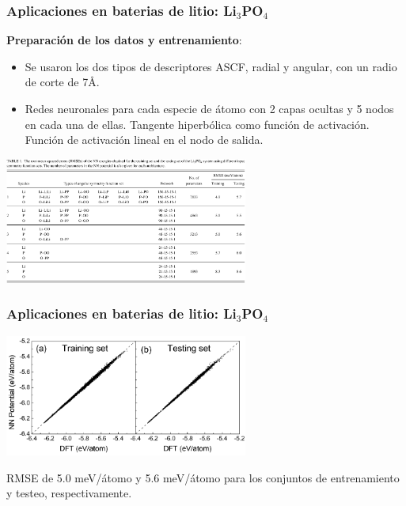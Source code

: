 \documentclass[aspectratio=169]{beamer}
\let\oldtextbf\textbf
\renewcommand{\textbf}[1]{\textcolor{nordblue}{\oldtextbf{#1}}}
\begin{document}
    \begin{frame}
        \frametitle{Aplicaciones en baterias de litio: Li$_3$PO$_4$}
            
        \textbf{Preparación de los datos y entrenamiento}:
        \begin{itemize}
            \item Se usaron los dos tipos de descriptores ASCF, radial y angular, 
                con un radio de corte de 7\AA.
            \item Redes neuronales para cada especie de átomo con 2 capas ocultas
                y 5 nodos en cada una de ellas. Tangente hiperbólica como función
                de activación. Función de activación lineal en el nodo de salida.
        \end{itemize}

        \pause

        \begin{center}
            \includegraphics[width=0.6\textwidth]{Li3PO4-rmse.png}
        \end{center}

    \end{frame}
    
    \begin{frame}
        \frametitle{Aplicaciones en baterias de litio: Li$_3$PO$_4$}

        \begin{center}
            \includegraphics[width=0.6\textwidth]{Li3PO4-training_testing.png}
        \end{center}

        RMSE de 5.0 meV/átomo y 5.6 meV/átomo para los conjuntos de entrenamiento
        y testeo, respectivamente.

    \end{frame}
\end{document}
